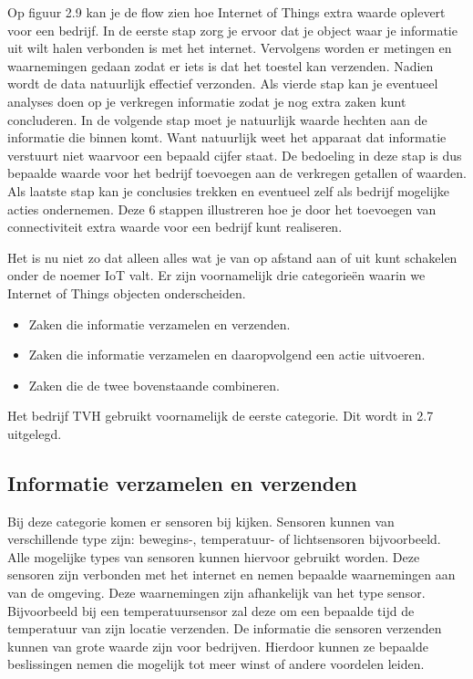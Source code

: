 Op figuur 2.9 kan je de flow zien hoe Internet of Things extra waarde oplevert voor een bedrijf. In de eerste stap zorg je ervoor dat je object waar je informatie uit wilt halen verbonden is met het internet. Vervolgens worden er metingen en waarnemingen gedaan zodat er iets is dat het toestel kan verzenden. Nadien wordt de data natuurlijk effectief verzonden. Als vierde stap kan je eventueel analyses doen op je verkregen informatie zodat je nog extra zaken kunt concluderen. In de volgende stap moet je natuurlijk waarde hechten aan de informatie die binnen komt. Want natuurlijk weet het apparaat dat informatie verstuurt niet waarvoor een bepaald cijfer staat. De bedoeling in deze stap is dus bepaalde waarde voor het bedrijf toevoegen aan de verkregen getallen of waarden. Als laatste stap kan je conclusies trekken en eventueel zelf als bedrijf mogelijke acties ondernemen. Deze 6 stappen illustreren hoe je door het toevoegen van connectiviteit extra waarde voor een bedrijf kunt realiseren.

Het is nu niet zo dat alleen alles wat je van op afstand aan of uit kunt schakelen onder de noemer IoT valt. Er zijn voornamelijk drie categorieën waarin we Internet of Things objecten onderscheiden.

\begin{itemize}
    \item Zaken die informatie verzamelen en verzenden.
    \item Zaken die informatie verzamelen en daaropvolgend een actie uitvoeren.
    \item Zaken die de twee bovenstaande combineren.
\end{itemize}

Het bedrijf TVH gebruikt voornamelijk de eerste categorie. Dit wordt in 2.7 uitgelegd.

\subsection{Informatie verzamelen en verzenden}
Bij deze categorie komen er sensoren bij kijken. Sensoren kunnen van verschillende type zijn: bewegins-, temperatuur- of lichtsensoren bijvoorbeeld. Alle mogelijke types van sensoren kunnen hiervoor gebruikt worden. Deze sensoren zijn verbonden met het internet en nemen bepaalde waarnemingen aan van de omgeving. Deze waarnemingen zijn afhankelijk van het type sensor. Bijvoorbeeld bij een temperatuursensor zal deze om een bepaalde tijd de temperatuur van zijn locatie verzenden. De informatie die sensoren verzenden kunnen van grote waarde zijn voor bedrijven. Hierdoor kunnen ze bepaalde beslissingen nemen die mogelijk tot meer winst of andere voordelen leiden. 

